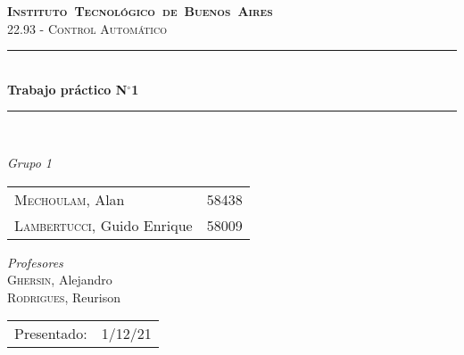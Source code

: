 \begin{titlepage}
\newcommand{\HRule}{\rule{\linewidth}{0.5mm}}
\center
\mbox{\textsc{\LARGE \bfseries {Instituto Tecnológico de Buenos Aires}}}\\[1.5cm]
\textsc{\Large 22.93 - Control Automático}\\[0.5cm]


\HRule \\[0.6cm]
{ \Huge \bfseries Trabajo práctico N$^{\circ}$1}\\[0.4cm] 
\HRule \\[1.5cm]


{\large

\emph{Grupo 1}\\
\vspace{3pt}

\begin{tabular}{lr} 	
\textsc{Mechoulam}, Alan  &  58438\\
\textsc{Lambertucci}, Guido Enrique  & 58009 \\
\end{tabular}

\vspace{20pt}

\emph{Profesores}\\
\textsc{Ghersin}, Alejandro\\
\textsc{Rodrigues}, Reurison\\



\vspace{3pt}

\vspace{100pt}

\begin{tabular}{ll}

Presentado: & 1/12/21\\

\end{tabular}

}

\vfill

\end{titlepage}
